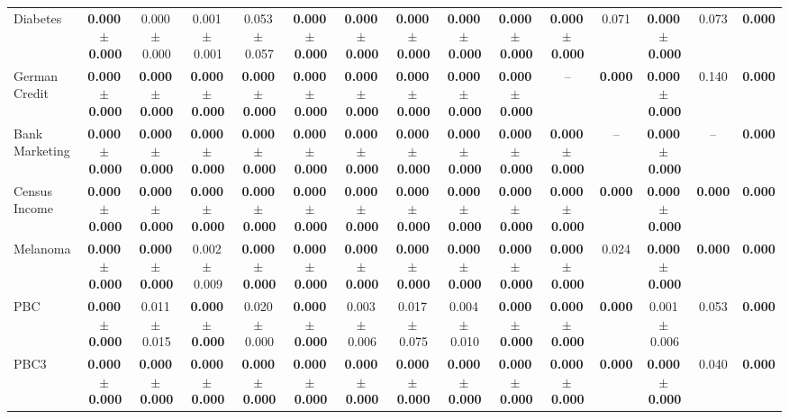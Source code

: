 \documentclass[8pt]{extarticle}
\begin{document}
\begin{longtable}{l*{14}{c}}
Diabetes & \textbf{0.000\,$\pm$\,0.000} & 0.000\,$\pm$\,0.000 & 0.001\,$\pm$\,0.001 & 0.053\,$\pm$\,0.057 & \textbf{0.000\,$\pm$\,0.000} & \textbf{0.000\,$\pm$\,0.000} & \textbf{0.000\,$\pm$\,0.000} & \textbf{0.000\,$\pm$\,0.000} & \textbf{0.000\,$\pm$\,0.000} & \textbf{0.000\,$\pm$\,0.000} & 0.071 & \textbf{0.000\,$\pm$\,0.000} & 0.073 & \textbf{0.000} \\
German Credit & \textbf{0.000\,$\pm$\,0.000} & \textbf{0.000\,$\pm$\,0.000} & \textbf{0.000\,$\pm$\,0.000} & \textbf{0.000\,$\pm$\,0.000} & \textbf{0.000\,$\pm$\,0.000} & \textbf{0.000\,$\pm$\,0.000} & \textbf{0.000\,$\pm$\,0.000} & \textbf{0.000\,$\pm$\,0.000} & \textbf{0.000\,$\pm$\,0.000} & -- & \textbf{0.000} & \textbf{0.000\,$\pm$\,0.000} & 0.140 & \textbf{0.000} \\
Bank Marketing & \textbf{0.000\,$\pm$\,0.000} & \textbf{0.000\,$\pm$\,0.000} & \textbf{0.000\,$\pm$\,0.000} & \textbf{0.000\,$\pm$\,0.000} & \textbf{0.000\,$\pm$\,0.000} & \textbf{0.000\,$\pm$\,0.000} & \textbf{0.000\,$\pm$\,0.000} & \textbf{0.000\,$\pm$\,0.000} & \textbf{0.000\,$\pm$\,0.000} & \textbf{0.000\,$\pm$\,0.000} & -- & \textbf{0.000\,$\pm$\,0.000} & -- & \textbf{0.000} \\
Census Income & \textbf{0.000\,$\pm$\,0.000} & \textbf{0.000\,$\pm$\,0.000} & \textbf{0.000\,$\pm$\,0.000} & \textbf{0.000\,$\pm$\,0.000} & \textbf{0.000\,$\pm$\,0.000} & \textbf{0.000\,$\pm$\,0.000} & \textbf{0.000\,$\pm$\,0.000} & \textbf{0.000\,$\pm$\,0.000} & \textbf{0.000\,$\pm$\,0.000} & \textbf{0.000\,$\pm$\,0.000} & \textbf{0.000} & \textbf{0.000\,$\pm$\,0.000} & \textbf{0.000} & \textbf{0.000} \\
Melanoma & \textbf{0.000\,$\pm$\,0.000} & \textbf{0.000\,$\pm$\,0.000} & 0.002\,$\pm$\,0.009 & \textbf{0.000\,$\pm$\,0.000} & \textbf{0.000\,$\pm$\,0.000} & \textbf{0.000\,$\pm$\,0.000} & \textbf{0.000\,$\pm$\,0.000} & \textbf{0.000\,$\pm$\,0.000} & \textbf{0.000\,$\pm$\,0.000} & \textbf{0.000\,$\pm$\,0.000} & 0.024 & \textbf{0.000\,$\pm$\,0.000} & \textbf{0.000} & \textbf{0.000} \\
PBC & \textbf{0.000\,$\pm$\,0.000} & 0.011\,$\pm$\,0.015 & \textbf{0.000\,$\pm$\,0.000} & 0.020\,$\pm$\,0.000 & \textbf{0.000\,$\pm$\,0.000} & 0.003\,$\pm$\,0.006 & 0.017\,$\pm$\,0.075 & 0.004\,$\pm$\,0.010 & \textbf{0.000\,$\pm$\,0.000} & \textbf{0.000\,$\pm$\,0.000} & \textbf{0.000} & 0.001\,$\pm$\,0.006 & 0.053 & \textbf{0.000} \\
PBC3 & \textbf{0.000\,$\pm$\,0.000} & \textbf{0.000\,$\pm$\,0.000} & \textbf{0.000\,$\pm$\,0.000} & \textbf{0.000\,$\pm$\,0.000} & \textbf{0.000\,$\pm$\,0.000} & \textbf{0.000\,$\pm$\,0.000} & \textbf{0.000\,$\pm$\,0.000} & \textbf{0.000\,$\pm$\,0.000} & \textbf{0.000\,$\pm$\,0.000} & \textbf{0.000\,$\pm$\,0.000} & \textbf{0.000} & \textbf{0.000\,$\pm$\,0.000} & 0.040 & \textbf{0.000} \\

\end{longtable}
\end{document}
